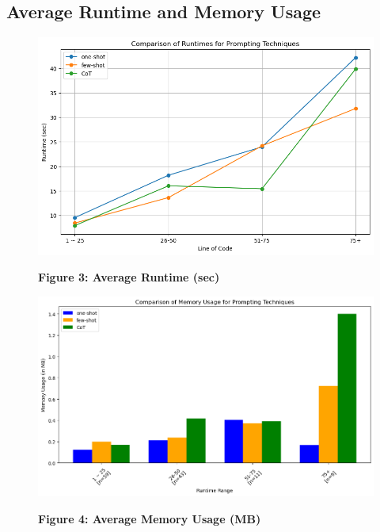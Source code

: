 \documentclass[onecolumn]{NobArticle}
\begin{document}
\subsection{Average Runtime and Memory Usage}
\begin{figure}[H]
    \centering
    \begin{minipage}{0.48\linewidth}
        \centering
        \includegraphics[width=\linewidth]{Runtime analysis.png}
         \begin{center}
        \textbf{Figure 3: Average Runtime (sec)}
    \end{center}
    \end{minipage}
    \hfill
        \begin{minipage}{0.48\linewidth}
        \centering
        \includegraphics[width=\linewidth]{Memory Usage.png}
         \begin{center}
        \textbf{Figure 4: Average Memory Usage (MB)}
    \end{center}
    \end{minipage}
\end{figure}
\end{document}
